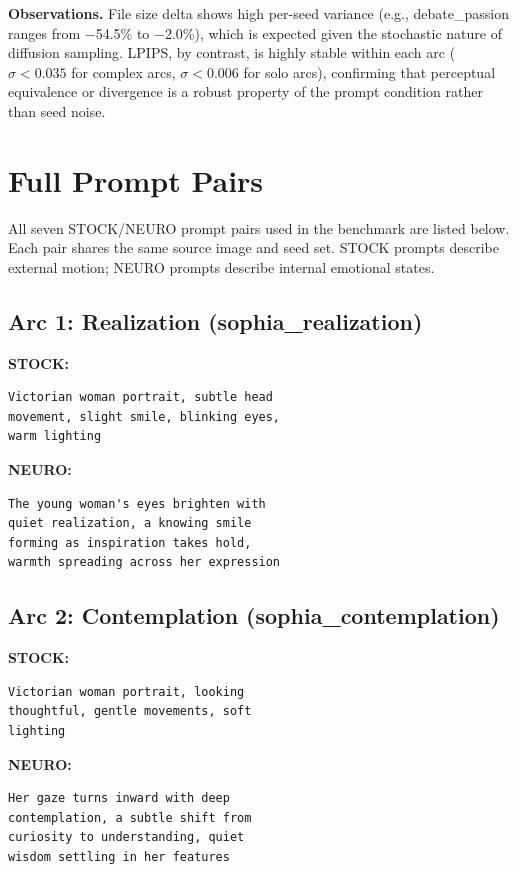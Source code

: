 \documentclass[10pt,twocolumn,letterpaper]{article}
\begin{document}
\textbf{Observations.} File size delta shows high per-seed variance (e.g., debate\_passion ranges from $-$54.5\% to $-$2.0\%), which is expected given the stochastic nature of diffusion sampling. LPIPS, by contrast, is highly stable within each arc ($\sigma < 0.035$ for complex arcs, $\sigma < 0.006$ for solo arcs), confirming that perceptual equivalence or divergence is a robust property of the prompt condition rather than seed noise.

\section{Full Prompt Pairs}
\label{sec:prompts}

All seven STOCK/NEURO prompt pairs used in the benchmark are listed below. Each pair shares the same source image and seed set. STOCK prompts describe external motion; NEURO prompts describe internal emotional states.

\subsection{Arc 1: Realization (sophia\_realization)}

\textbf{STOCK:}
\begin{lstlisting}
Victorian woman portrait, subtle head
movement, slight smile, blinking eyes,
warm lighting
\end{lstlisting}

\textbf{NEURO:}
\begin{lstlisting}
The young woman's eyes brighten with
quiet realization, a knowing smile
forming as inspiration takes hold,
warmth spreading across her expression
\end{lstlisting}

\subsection{Arc 2: Contemplation (sophia\_contemplation)}

\textbf{STOCK:}
\begin{lstlisting}
Victorian woman portrait, looking
thoughtful, gentle movements, soft
lighting
\end{lstlisting}

\textbf{NEURO:}
\begin{lstlisting}
Her gaze turns inward with deep
contemplation, a subtle shift from
curiosity to understanding, quiet
wisdom settling in her features
\end{lstlisting}
\end{document}

